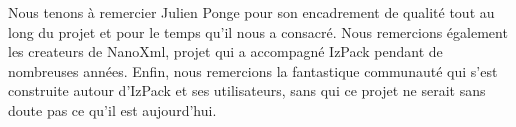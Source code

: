 Nous tenons à remercier Julien Ponge pour son encadrement de qualité tout au long du projet et pour le temps qu'il nous a consacré.
Nous remercions également les createurs de NanoXml, projet qui a accompagné IzPack pendant de nombreuses années.
Enfin, nous remercions la fantastique communauté qui s'est construite autour d'IzPack et ses utilisateurs, sans qui ce projet ne serait sans doute pas ce qu'il est aujourd'hui.